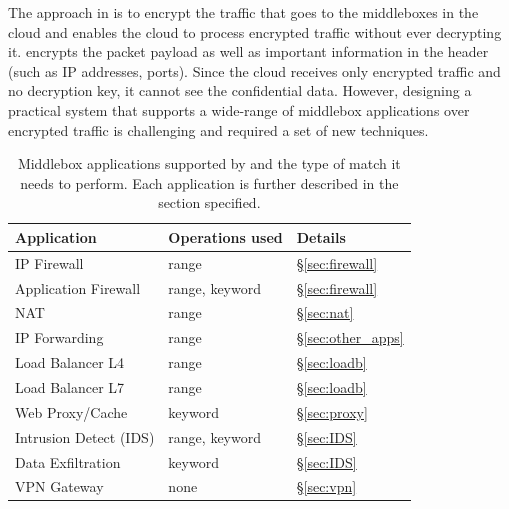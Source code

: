     The approach in \sys is to encrypt the traffic that goes to  the middleboxes in the cloud and enables the cloud to process encrypted traffic without ever decrypting it. \sys encrypts the packet payload as well as important information in the header (such as IP addresses, ports). Since the cloud receives only encrypted traffic and no decryption key, it cannot see the confidential data. However, designing a practical system that supports a wide-range of middlebox applications over encrypted traffic is challenging and required a set of new techniques.
    
    
    
    
\begin{table}[t!]
\centering
\begin{tabular}{p{3.2cm}|p{2.9cm}|p{1cm}}
{\bf Application}  & {\bf Operations used} & {\bf Details} \\
\hline \hline
IP Firewall &   range  & \S\ref{sec:firewall} \\
Application Firewall & range, keyword  & \S\ref{sec:firewall}\\
NAT & range  & \S\ref{sec:nat} \\
IP Forwarding  & range & \S\ref{sec:other_apps} \\
Load Balancer L4 & range & \S\ref{sec:loadb}\\
Load Balancer L7  & range & \S\ref{sec:loadb}\\
Web Proxy/Cache  & keyword & \S\ref{sec:proxy}\\
Intrusion Detect (IDS)  & range, keyword & \S\ref{sec:IDS}\\
Data Exfiltration  & keyword & \S\ref{sec:IDS} \\
VPN Gateway &  none & \S\ref{sec:vpn} \\ 
\end{tabular}
\caption{Middlebox applications supported by \sys and the type of match it needs to perform. Each application is further described in the section specified. \label{tab:apps-ops} }
\end{table}


